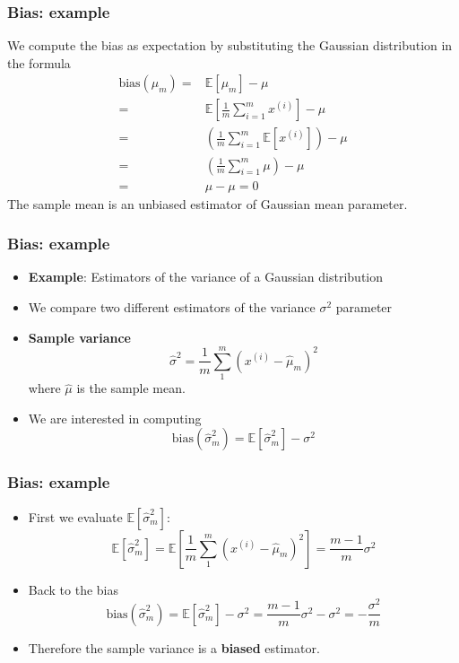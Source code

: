 \documentclass[notes]{beamer}          %
\newcommand{\field}[1]{\mathbb{#1}}
\begin{document}
\begin{frame}
\frametitle{Bias: example}
    We compute the bias as expectation by substituting the Gaussian distribution in the formula
    \begin{eqnarray*}
    \mbox{bias}(\mu_m) =  & \field{E}[\mu_m] - \mu  \\
     = & \field{E} \left [   \frac{1}{m} \sum_{i=1}^{m }x^{(i)} \right ] - \mu \\
     = & \left (   \frac{1}{m} \sum_{i=1}^{m} \field{E}[x^{(i)}] \right ) - \mu \\
     = & \left (   \frac{1}{m} \sum_{i=1}^{m} \mu \right ) - \mu \\
     = & \mu - \mu = 0
    \end{eqnarray*}
    The sample mean is an unbiased estimator of Gaussian mean parameter.
\end{frame}



\begin{frame}
\frametitle{Bias: example}
    \begin{itemize}
        \item {\bf Example}: Estimators of the variance of a Gaussian distribution
        \item We compare two different estimators of the variance $\sigma^2$ parameter
        \item {\bf Sample variance}
        $$
        \hat{\sigma}^2 = \frac{1}{m}\sum_{1}^{m} \left (  x^{(i)} - \hat{\mu}_m \right )^2
        $$
        where $\hat{\mu}$ is the sample mean.
        \item We are interested in computing
        $$
        \mbox{bias}(\hat{\sigma}^2_m) = \field{E} [\hat{\sigma}^2_m] - \sigma^2
        $$
    \end{itemize}
\end{frame}


\begin{frame}
\frametitle{Bias: example}
\begin{itemize}
    \item First we evaluate $\field{E} [\hat{\sigma}^2_m]$:
    $$
    \field E [\hat{\sigma}^2_m] = \field{E} \left [ \frac{1}{m}\sum_{1}^{m} \left (  x^{(i)} - \hat{\mu}_m \right )^2 \right ] = \frac{m-1}{m} \sigma^2
    $$
    \item Back to the bias
    $$
    \mbox{bias}(\hat{\sigma}^2_m) = \field{E} [\hat{\sigma}^2_m] - \sigma^2  = \frac{m-1}{m} \sigma^2 - \sigma^2 = -\frac{\sigma^2}{m}
    $$
    \item Therefore the sample variance is a \textbf{biased} estimator.
\end{itemize}
\end{frame}
\end{document}
